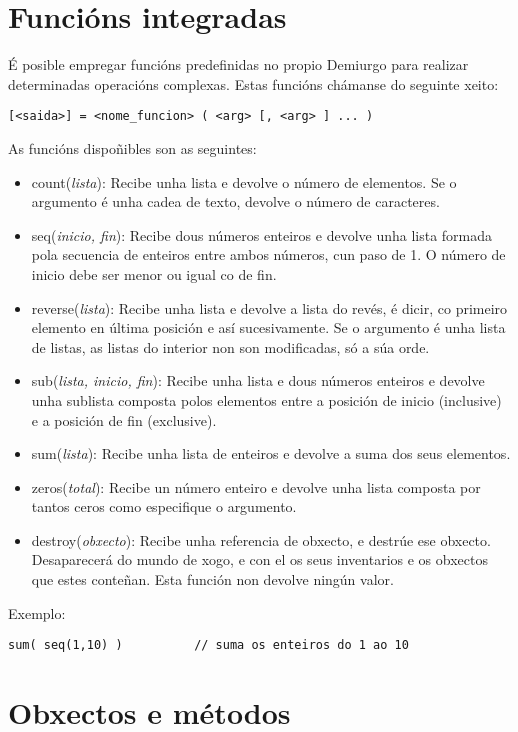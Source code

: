 \section{Funcións integradas}
É posible empregar funcións predefinidas no propio Demiurgo para realizar
determinadas operacións complexas. Estas funcións chámanse do seguinte xeito:
\begin{lstlisting}
[<saida>] = <nome_funcion> ( <arg> [, <arg> ] ... )
\end{lstlisting}
\par As funcións dispoñibles son as seguintes:
\begin{itemize}
  \item count({\it lista}): Recibe unha lista e devolve o número de elementos.
  Se o argumento é unha cadea de texto, devolve o número de caracteres.
  \item seq({\it inicio, fin}): Recibe dous números enteiros e devolve unha
  lista formada pola secuencia de enteiros entre ambos números, cun paso de 1. O
  número de inicio debe ser menor ou igual co de fin.
  \item reverse({\it lista}): Recibe unha lista e devolve a lista do revés, é
  dicir, co primeiro elemento en última posición e así sucesivamente. Se o
  argumento é unha lista de listas, as listas do interior non son modificadas,
  só a súa orde.
  \item sub({\it lista, inicio, fin}): Recibe unha lista e dous números
  enteiros e devolve unha sublista composta polos elementos entre a posición de inicio
  (inclusive) e a posición de fin (exclusive).
  \item sum({\it lista}): Recibe unha lista de enteiros e devolve a suma dos
  seus elementos.
  \item zeros({\it total}): Recibe un número enteiro e devolve unha lista
  composta por tantos ceros como especifique o argumento.
  \item destroy({\it obxecto}): Recibe unha referencia de obxecto, e destrúe ese
  obxecto. Desaparecerá do mundo de xogo, e con el os seus inventarios e os
  obxectos que estes conteñan. Esta función non devolve ningún valor.
\end{itemize}
\par Exemplo:
\begin{lstlisting}
sum( seq(1,10) )          // suma os enteiros do 1 ao 10
\end{lstlisting}

\section{Obxectos e métodos}
